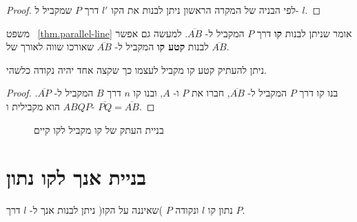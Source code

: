 \begin{proof}
לפי הבניה של המקרה הראשון ניתן לבנות את הקו
$l'$
דרך 
$P$
שמקביל ל-%
$l$.
\end{proof}

משפט~%
\ref{thm.parallel-line}
אומר שניתן לבנות 
\textbf{קו}
דרך 
$P$
המקביל ל-%
$\overline{AB}$.
למעשה גם אפשר לבנות
\textbf{קטע קו}
המקביל ל-%
$\overline{AB}$
שאורכו שווה לאורך של
$\overline{AB}$.

\begin{theorem}
ניתן להעתיק קטע קו מקביל לעצמו כך שקצה אחד יהיה נקודה כלשהי.
\end{theorem}

\begin{proof}
בנו קו דרך
$P$
המקביל ל-%
$\overline{AB}$,
חברו את
$P$
ו-%
$A$,
ובנו קו
$n$
דרך 
$B$
המקביל ל-%
$\overline{AP}$.
$ABQP$
הוא מקבילית ו-%
$\overline{PQ}=\overline{AB}$.
\end{proof}

\begin{figure}[htb]
\begin{center}
\caption{בניית העתק של קו מקביל לקו קיים}\label{f.se-parallel-other4}
\end{center}
\end{figure}


\section{בניית אנך לקו נתון}\label{s.perpendicular}

\begin{theorem}\label{thm.perpendicular}
נתון קו
$l$
ונקודה
$P$
)שאיננה על הקו( ניתן לבנות אנך ל-%
$l$
דרך
$P$.%
\end{theorem}

